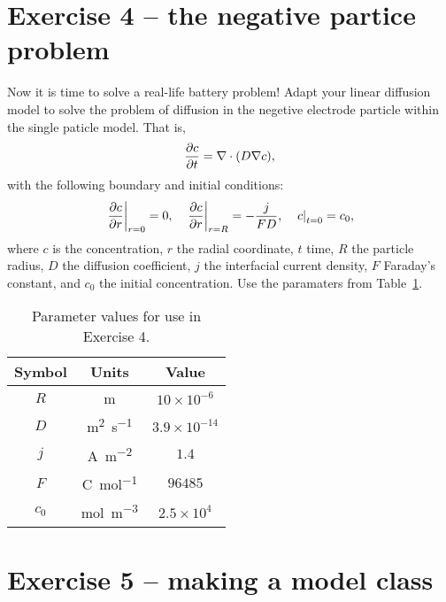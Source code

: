 \documentclass[a4paper,11pt]{article}
\begin{document}
\section*{Exercise 4 -- the negative partice problem}
Now it is time to solve a real-life battery problem! Adapt your linear diffusion model to solve the problem of diffusion in the negetive electrode particle within the single paticle model. That is,
\begin{equation*}
  \pdv{c}{t} = \nabla \cdot (D \nabla c),
\end{equation*}
with the following boundary and initial conditions:
\begin{equation*}
  \left.\pdv{c}{r}\right\vert_{r=0} = 0, \quad \left.\pdv{c}{r}\right\vert_{r=R} = -\frac{j}{FD}, \quad \left.c\right\vert_{t=0} = c_0,
\end{equation*}
where $c$ is the concentration, $r$ the radial coordinate, $t$ time, $R$ the particle radius, $D$ the diffusion coefficient, $j$ the interfacial current density, $F$ Faraday's constant, and $c_0$ the initial concentration. Use the paramaters from Table~\ref{Table:Ex4}.

\begin{table}[htb]
	\centering
	\begin{tabular}{c c c}
	\toprule
     Symbol & Units & Value \\
    \midrule
    $R$ & \si{m} & $10 \times 10^{-6}$\\
    $D$ & \si{m^2.s^{-1}} & $3.9 \times 10^{-14}$ \\
    $j$ & \si{A.m^{-2}} & $1.4$ \\
    $F$ & \si{C.mol^{-1}} & $96485$ \\
    $c_0$ & \si{mol.m^{-3}} & $2.5 \times 10^4$ \\
    \bottomrule
    \end{tabular}
    \caption{Parameter values for use in Exercise 4.}
    \label{Table:Ex4}
\end{table}

\section*{Exercise 5 -- making a model class}
\end{document}
